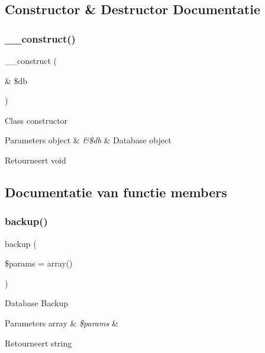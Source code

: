 \subsection{Constructor \& Destructor Documentatie}
\mbox{\label{class_c_i___d_b__utility_aaf2ef772755ec6f361d44e16cc9ffd69}} 
\subsubsection{\texorpdfstring{\_\_construct()}{\_\_construct()}}
{\footnotesize\ttfamily \+\_\+\+\_\+construct (\begin{DoxyParamCaption}\item[{\&}]{\$db }\end{DoxyParamCaption})}

Class constructor


\begin{DoxyParams}[1]{Parameters}
object & {\em \&\$db} & Database object \\
\hline
\end{DoxyParams}
\begin{DoxyReturn}{Retourneert}
void 
\end{DoxyReturn}


\subsection{Documentatie van functie members}
\mbox{\label{class_c_i___d_b__utility_abe2b9d47f950dfbaf8c6ec757a9af9a2}} 
\subsubsection{\texorpdfstring{backup()}{backup()}}
{\footnotesize\ttfamily backup (\begin{DoxyParamCaption}\item[{}]{\$params = {\ttfamily array()} }\end{DoxyParamCaption})}

Database Backup


\begin{DoxyParams}[1]{Parameters}
array & {\em \$params} & \\
\hline
\end{DoxyParams}
\begin{DoxyReturn}{Retourneert}
string 
\end{DoxyReturn}
\mbox{\label{class_c_i___d_b__utility_aba64f8ac8169c018d251eefe95de1c84}} 
